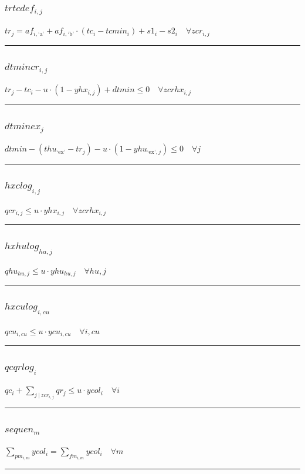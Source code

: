 \documentclass[11pt]{article}
\begin{document}
\subsubsection*{$trtcdef_{i,j}$}
$
tr_{j} = af_{i,\text{`a'}} + af_{i,\text{`b'}} \cdot (tc_{i} - tcmin_{i}) + s1_{i} - s2_{i}\quad \forall zcr_{i,j}
$
\vspace{5pt}
\hrule
\subsubsection*{$dtmincr_{i,j}$}
$
tr_{j} - tc_{i} - u \cdot (1 - yhx_{i,j}) + dtmin \leq 0\quad \forall zcrhx_{i,j}
$
\vspace{5pt}
\hrule
\subsubsection*{$dtminex_{j}$}
$
dtmin - (thu_{\text{`ex'}} - tr_{j}) - u \cdot (1 - yhu_{\text{`ex'},j}) \leq 0\quad \forall j
$
\vspace{5pt}
\hrule
\subsubsection*{$hxclog_{i,j}$}
$
qcr_{i,j} \leq u \cdot yhx_{i,j}\quad \forall zcrhx_{i,j}
$
\vspace{5pt}
\hrule
\subsubsection*{$hxhulog_{hu,j}$}
$
qhu_{hu,j} \leq u \cdot yhu_{hu,j}\quad \forall hu,j
$
\vspace{5pt}
\hrule
\subsubsection*{$hxculog_{i,cu}$}
$
qcu_{i,cu} \leq u \cdot ycu_{i,cu}\quad \forall i,cu
$
\vspace{5pt}
\hrule
\subsubsection*{$qcqrlog_{i}$}
$
qc_{i} + \sum_{j ~ | ~ zcr_{i,j}} qr_{j} \leq u \cdot ycol_{i}\quad \forall i
$
\vspace{5pt}
\hrule
\subsubsection*{$sequen_{m}$}
$
\sum_{pm_{i,m}} ycol_{i} = \sum_{fm_{i,m}} ycol_{i}\quad \forall m
$
\vspace{5pt}
\hrule
\end{document}
